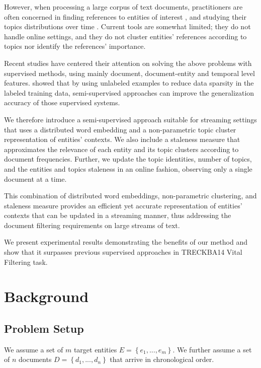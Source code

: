\documentclass{article}
\begin{document}
However, when processing a large corpus of text documents, practitioners are often concerned in finding references to entities of interest \cite{RaoMD10, choi2007}, and studying their topics distributions over time \cite{blei12}. Current tools are somewhat limited; they do not handle online settings, and they do not cluster entities' references according to topics nor identify the references' importance.

Recent studies \cite{xitong13, bouvier13, efron13, zhang13, bellogin13} have centered their attention on solving the above problems with supervised methods, using mainly document, document-entity and temporal level features. \citet{Turian10wordrepresentations} showed that by using unlabeled examples to reduce data sparsity in the labeled training data, semi-supervised approaches can improve the generalization accuracy of those supervised systems.

We therefore introduce a semi-supervised approach suitable for streaming settings that uses a distributed word embedding and a non-parametric topic cluster representation of entities' contexts. We also include a staleness measure that approximates the relevance of each entity and its topic clusters according to document frequencies. Further, we update the topic identities, number of topics, and the entities and topics staleness in an online fashion, observing only a single document at a time.

This combination of distributed word embeddings, non-parametric clustering, and staleness measure provides an efficient yet accurate representation of entities' contexts that can be updated in a streaming manner, thus addressing the document filtering requirements on large streams of text.

We present experimental results demonstrating the benefits of our method and show that it surpasses previous supervised approaches in TRECKBA14 Vital Filtering task.

\section{Background}
\label{background}

\subsection{Problem Setup}
\label{setup}

We assume a set of $m$ target entities $E = \left\{ {e_1, ..., e_m}\right\}$. We further assume a set of $n$ documents $D = \left\{ {d_{1}, ..., d_{n}}\right\}$ that arrive in chronological order. 
 
\end{document}
